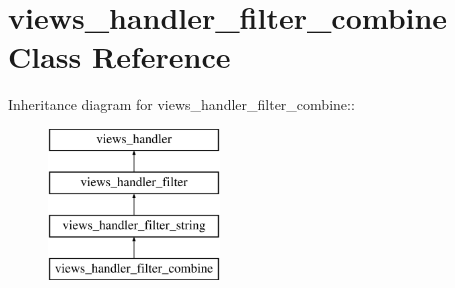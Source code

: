 \hypertarget{classviews__handler__filter__combine}{
\section{views\_\-handler\_\-filter\_\-combine Class Reference}
\label{classviews__handler__filter__combine}
}
Inheritance diagram for views\_\-handler\_\-filter\_\-combine::\begin{figure}[H]
\begin{center}
\leavevmode
\includegraphics[height=4cm]{classviews__handler__filter__combine}
\end{center}
\end{figure}
